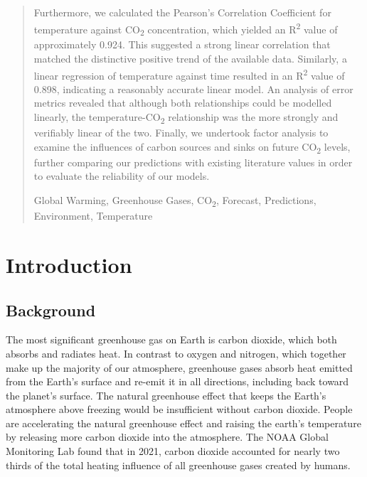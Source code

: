 \documentclass[12pt]{mcmthesis}
\begin{document}
\begin{abstract}
        Furthermore, we calculated the Pearson’s Correlation Coefficient for temperature against CO\textsubscript{2} concentration, which yielded an R\textsuperscript{2} value of approximately 0.924. This suggested a strong linear correlation that matched the distinctive positive trend of the available data. Similarly, a linear regression of temperature against time resulted in an R\textsuperscript{2} value of 0.898, indicating a reasonably accurate linear model. An analysis of error metrics revealed that although both relationships could be modelled linearly, the temperature-CO\textsubscript{2} relationship was the more strongly and verifiably linear of the two. Finally, we undertook factor analysis to examine the influences of carbon sources and sinks on future CO\textsubscript{2} levels, further comparing our predictions with existing literature values in order to evaluate the reliability of our models.



        \begin{keywords}
            Global Warming, Greenhouse Gases, CO\textsubscript{2}, Forecast, Predictions, Environment, Temperature
        \end{keywords}

    \end{abstract}

    \maketitle

    \setcounter{page}{2}

    \setlength{\cftparskip}{0pt}
    \tableofcontents

    \newpage


    


    \section{Introduction}

    \subsection{Background}
    The most significant greenhouse gas on Earth is carbon dioxide, which both absorbs and radiates heat. In contrast to oxygen and nitrogen, which together make up the majority of our atmosphere, greenhouse gases absorb heat emitted from the Earth's surface and re-emit it in all directions, including back toward the planet's surface. The natural greenhouse effect that keeps the Earth's atmosphere above freezing would be insufficient without carbon dioxide. People are accelerating the natural greenhouse effect and raising the earth's temperature by releasing more carbon dioxide into the atmosphere. The NOAA Global Monitoring Lab found that in 2021, carbon dioxide accounted for nearly two thirds of the total heating influence of all greenhouse gases created by humans.
\end{document}

